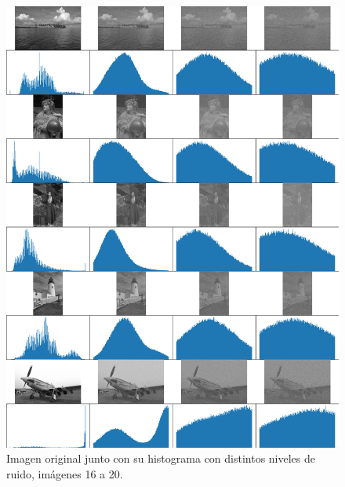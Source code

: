 \begin{figure}
    \centering
    \includegraphics[width=\textwidth]{figuras/img_hist_noise_4.png}
    \caption{Imagen original junto con su histograma con distintos niveles de ruido, im\'agenes 16 a 20.}
\end{figure}


